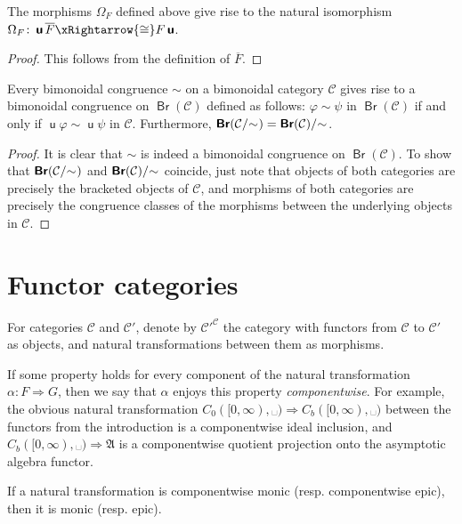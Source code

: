 \documentclass[10pt]{simplearticle}
\newcommand{\mathsb}[1]{\boldsymbol{\mathsf{#1}}}
\newcommand{\mmph}{\text{{␣}}}
\newcommand{\Br}{\operatorname{\mathsb{Br}}}
\renewcommand{\u}{\operatorname{\mathsb u}}
\newcommand{\modrel}[1]{/\hspace{-0.6ex}#1\hspace{0.1ex}}
\begin{document}
\begin{prop}\label{prop:natOmega}
The morphisms $\Omega_{F}$ defined above give
rise to the natural isomorphism $\Omega_{F}\colon\u\overline{F}\xRightarrow{\cong}F\u$.
\end{prop}

\begin{proof}
This follows from the definition of $\overline{F}$.
\end{proof}

\begin{prop}\label{prop:brquot}
Every bimonoidal congruence $\sim$ on a bimonoidal
category $\mathcal{C}$ gives rise to a bimonoidal congruence on $\Br(\mathcal{C})$
defined as follows: $\varphi\sim\psi$ in $\Br(\mathcal{C})$ if and
only if $\u\varphi\sim\u\psi$ in $\mathcal{C}$. Furthermore, $\Br(\mathcal{C}\modrel{\sim})=\Br(\mathcal{C})\modrel{\sim}$.
\end{prop}

\begin{proof}
It is clear that $\sim$ is indeed a bimonoidal congruence on $\Br(\mathcal{C})$.
To show that $\Br(\mathcal{C}\modrel{\sim})$ and $\Br(\mathcal{C})\modrel{\sim}$
coincide, just note that objects of both categories are precisely
the bracketed
objects of $\mathcal{C}$, and morphisms
of both categories are precisely the congruence classes of the morphisms
between the underlying objects in $\mathcal{C}$.
\end{proof}
\section{Functor categories}

For categories $\mathcal{C}$ and $\mathcal{C}'$, denote by $\mathcal{C}'^{\mathcal{C}}$
the category with functors from $\mathcal{C}$ to $\mathcal{C}'$
as objects, and natural transformations between them as morphisms.

If some property holds for every component of the natural transformation
$\alpha\colon F\Rightarrow G$, then we say that $\alpha$ enjoys
this property \emph{componentwise}. For example, the obvious natural
transformation $C_{0}([0,\infty),\mmph)\Rightarrow C_{b}([0,\infty),\mmph)$
between the functors from the introduction is a componentwise ideal
inclusion, and $C_{b}([0,\infty),\mmph)\Rightarrow\mathfrak{A}$ is
a componentwise quotient projection onto the asymptotic
algebra functor.
\begin{lem}\label{lem:cw-epic-epic}
If a natural transformation is componentwise
monic (resp. componentwise epic), then it is monic (resp. epic).
\end{lem}
\end{document}

